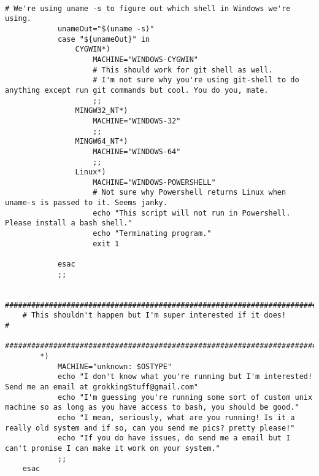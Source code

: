 \documentclass[11pt]{article}
\begin{document}
\begin{verbatim}
                                                                                  # We're using uname -s to figure out which shell in Windows we're using.
            unameOut="$(uname -s)"
            case "${unameOut}" in
                CYGWIN*)
                    MACHINE="WINDOWS-CYGWIN"
                    # This should work for git shell as well.
                    # I'm not sure why you're using git-shell to do anything except run git commands but cool. You do you, mate.
                    ;;
                MINGW32_NT*)
                    MACHINE="WINDOWS-32"
                    ;;
                MINGW64_NT*)
                    MACHINE="WINDOWS-64"
                    ;;
                Linux*)
                    MACHINE="WINDOWS-POWERSHELL"
                    # Not sure why Powershell returns Linux when uname-s is passed to it. Seems janky.
                    echo "This script will not run in Powershell. Please install a bash shell."
                    echo "Terminating program."
                    exit 1

            esac
            ;;

    #########################################################################
    # This shouldn't happen but I'm super interested if it does!            #
    #########################################################################
        *)
            MACHINE="unknown: $OSTYPE"
            echo "I don't know what you're running but I'm interested! Send me an email at grokkingStuff@gmail.com"
            echo "I'm guessing you're running some sort of custom unix machine so as long as you have access to bash, you should be good."
            echo "I mean, seriously, what are you running! Is it a really old system and if so, can you send me pics? pretty please!"
            echo "If you do have issues, do send me a email but I can't promise I can make it work on your system."
            ;;
    esac


\end{verbatim}
\end{document}
